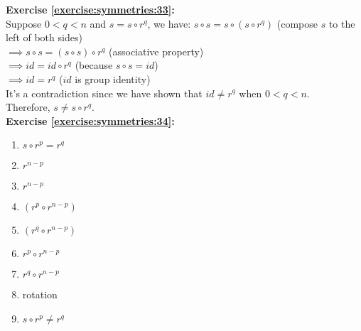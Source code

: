 \noindent\textbf{Exercise \ref{exercise:symmetries:33}:}\\
%
Suppose $0<q<n$ and $s=s\circ r^q$, we have:
$s\circ s=s\circ(s\circ r^q)$ (compose $s$ to the left of both sides)\\
$\implies s\circ s=(s\circ s)\circ r^q$ (associative property)\\
$\implies id=id\circ r^q$ (because $s\circ s=id$)\\
$\implies id=r^q$ ($id$ is group identity)\\
It's a contradiction since we have shown that $id\neq r^q$ when $0<q<n$.\\
Therefore, $s\neq s\circ r^q$.\\

\noindent\textbf{Exercise \ref{exercise:symmetries:34}:}
\begin{multicols}{3}
\begin{enumerate}
\item
$s\circ r^p=r^q$

\item
$r^{n-p}$

\item
$r^{n-p}$

\item
$(r^p\circ r^{n-p})$

\item
$(r^q\circ r^{n-p})$

\item
$r^p\circ r^{n-p}$

\item
$r^q\circ r^{n-p}$

\item
rotation

\item
$s\circ r^p\neq r^q$
\end{enumerate}
\end{multicols}


